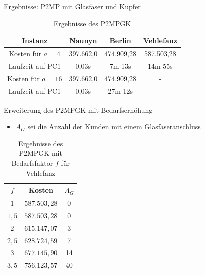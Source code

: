 \documentclass{beamer}
\begin{document}
\begin{frame}{Ergebnisse: P2MP mit Glasfaser und Kupfer}
	 \begin{table}[h]
	 	\centering
	 	\begin{tabular}{c|c|c|c}
	 		Instanz & Naunyn & Berlin & Vehlefanz \\	
	 		\hline
	 		Kosten für $a=4$ & 397.662,0 & 474.909,28 & 587.503,28 \\
	 		Laufzeit auf PC1 & 0,03s & 7m 13s & 14m 55s \\
	 		\hline
	 		Kosten für $a=16$ & 397.662,0 & 474.909,28 & -\\
	 		Laufzeit auf PC1 & 0,03s & 27m 12s & - \\
	 	\end{tabular}
	 	\caption{Ergebnisse des P2MPGK}
	 	\label{P2MPGK}
	 \end{table}
\end{frame}

\begin{frame}{Erweiterung des P2MPGK mit Bedarfserhöhung}
				\begin{itemize}
					\item $A_G$ sei die Anzahl der Kunden mit einem Glasfaseranschluss
				\end{itemize}
\begin{table}[!htbp]
	\centering
	\begin{tabular}{c|c|c}
		\centering
		$f$ & Kosten & $A_G$ \\	
		\hline
		$1$   	 &  \(587.503,28\) & 0  \\
		$1,5$ 	&   $587.503,28$  & 0  \\
		$2$   	&   $615.147,07$ & 3 \\
		$2,5$   	&   $628.724,59$ & 7 \\
		$3$    &   $677.145,90$ & 14 \\
		$3,5$   	&   $756.123,57$ & 40 \\
	\end{tabular}
	\caption{Ergebnisse des P2MPGK mit Bedarfsfaktor $f$ f\"ur Vehlefanz} 
	\label{P2MPGKBedarfV}
\end{table}
\end{frame}
\end{document}
